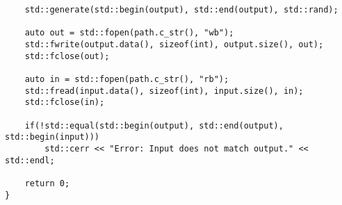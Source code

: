 \begin{appendix}
\begin{verbatim}
    std::generate(std::begin(output), std::end(output), std::rand);
    
    auto out = std::fopen(path.c_str(), "wb");
    std::fwrite(output.data(), sizeof(int), output.size(), out);
    std::fclose(out);
    
    auto in = std::fopen(path.c_str(), "rb");
    std::fread(input.data(), sizeof(int), input.size(), in);
    std::fclose(in);
    
    if(!std::equal(std::begin(output), std::end(output), std::begin(input)))
        std::cerr << "Error: Input does not match output." << std::endl;
        
    return 0;
}
\end{verbatim}

\end{appendix}